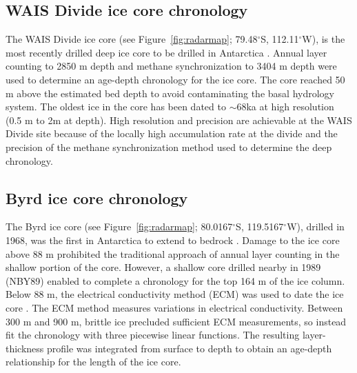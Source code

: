 \documentclass[12pt]{article}
\begin{document}


\subsection{WAIS Divide ice core chronology}
The WAIS Divide ice core (see Figure~\ref{fig:radarmap}; 79.48$^{\circ}$S, 112.11$^{\circ}$W), is the most recently drilled deep ice core to be drilled in Antarctica \citep{buizert2015}. Annual layer counting to 2850 m depth and methane synchronization to 3404 m depth were used to determine an age-depth chronology for the ice core. The core reached 50 m above the estimated bed depth to avoid contaminating the basal hydrology system. The oldest ice in the core has been dated to $\sim$68ka at high resolution (0.5 m to 2m at depth). High resolution and precision are achievable at the WAIS Divide site because of the locally high accumulation rate at the divide and the precision of the methane synchronization method used to determine the deep chronology.


\subsection{Byrd ice core chronology}

The Byrd ice core (see Figure~\ref{fig:radarmap}; 80.0167$^\circ$S, 119.5167$^\circ$W), drilled in 1968, was the first in Antarctica to extend to bedrock \citep{gow1968}. Damage to the ice core above 88 m prohibited the traditional approach of annual layer counting in the shallow portion of the core. However, a shallow core drilled nearby in 1989 (NBY89) enabled \citet{langway1994} to complete a chronology for the top 164 m of the ice column. Below 88 m, the electrical conductivity method (ECM) was used to date the ice core \citep{hammer1994}. The ECM method measures variations in electrical conductivity. Between 300 m and 900 m, brittle ice precluded sufficient ECM measurements, so \citet{hammer1994} instead fit the chronology with three piecewise linear functions. The resulting layer-thickness profile was integrated from surface to depth to obtain an age-depth relationship for the length of the ice core.
\end{document}
